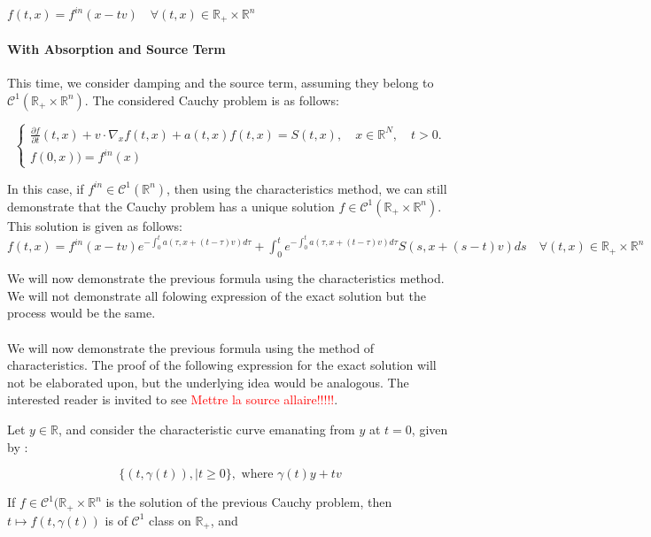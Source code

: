 \documentclass[a4paper, 11pt]{article}
\begin{document}
$\boxed{f(t,x)=f^{in}(x-tv) \quad \forall (t,x) \in \mathbb{R}_+ \times \mathbb{R}^n }$




\paragraph{With Absorption and Source Term}



This time, we consider damping and the source term, assuming they belong to $\mathcal{C}^1(\mathbb{R}_+ \times \mathbb{R}^n)$. The considered Cauchy problem is as follows:


\[
\begin{cases}
\frac{\partial f}{\partial t}(t,x)+v \cdot \nabla_x f(t,x) + a(t,x)f(t,x) = S(t,x), \quad x \in \mathbb{R}^N, \quad t>0.\\
f(0,x)) = f^{in}(x)
\end{cases}
\]

In this case, if $f^{in} \in \mathcal{C}^1(\mathbb{R}^n)$, then using the characteristics method, we can still demonstrate that the Cauchy problem has a unique solution $f \in \mathcal{C}^1(\mathbb{R}_+ \times \mathbb{R}^n)$. This solution is given as follows:\\
$\boxed{f(t,x)=f^{in}(x-tv) e^{-\int_0 ^t a(\tau,x+(t-\tau)v)d\tau} + \int_0 ^t  e^{-\int_0 ^t a(\tau,x+(t-\tau)v)d\tau} S(s,x+(s-t)v)ds \quad \forall (t,x) \in \mathbb{R}_+ \times \mathbb{R}^n }$

We will now demonstrate the previous formula using the characteristics method. We will not demonstrate all folowing expression of the exact solution but the process would be the same.

\paragraph{}

We will now demonstrate the previous formula using the method of characteristics. The proof of the following expression for the exact solution will not be elaborated upon, but the underlying idea would be analogous. The interested reader is invited to see \textcolor{red}{Mettre la source allaire!!!!!}.

Let $y \in \mathbb{R}$, and consider the characteristic curve emanating from $y$ at $t=0$, given by :

\[ \{(t,\gamma(t)), | t\geq 0\} , \text{ where } \gamma (t) 	y+tv\]

If $f \in \mathcal{C}^1(\mathbb{R}_+ \times \mathbb{R}^n$ is the solution of the previous Cauchy problem, then $t \mapsto f(t,\gamma(t))$ is of $\mathcal{C}^1$ class on $\mathbb{R}_+$, and 
\end{document}
